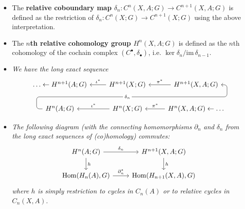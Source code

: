 \documentclass[10pt]{article}
\newcommand{\im}{\mathrm{im}\,}
\DeclareMathOperator{\Hom}{Hom}
\begin{document}
\begin{itemize}
                    \item The \textbf{relative coboundary map $\delta_n\colon C^n(X,A;G)\to C^{n+1}(X,A;G)$} is defined as the restriction of $\delta_n\colon C^n(X;G)\to C^{n+1}(X;G)$ using the above interpretation.
                    \item The \textbf{$n$th relative cohomology group $H^n(X,A;G)$} is defined as the $n$th cohomology of the cochain complex $(C^\bullet,\delta_\bullet)$, i.e. $\ker\delta_n/\im\delta_{n-1}$.
                    \item \emph{We have the long exact sequence}
                        \begin{equation*}
                            \begin{tikzcd}
                                \ldots\leftarrow{H}^{n+1}(A;G)
                                & {H}^{n+1}(X;G) \lar[swap]{\iota^*} \ar[draw=none]{d}[name=X, anchor=center]{}
                                & {H}^{n+1}(X,A;G) \lar[swap]{\pi^*}\\
                                {H}^n(A;G) \ar[rounded corners,
                                        to path={ -- ([xshift=-2ex]\tikztostart.west)
                                                  |- (X.center) \tikztonodes
                                                  -| ([xshift=2ex]\tikztotarget.east)
                                                  -- (\tikztotarget)}]{urr}[description, at end]{\delta_n}
                                & {H}^n(X;G) \lar[swap]{\iota^*}
                                & {H}^n(X,A;G) \lar[swap]{\pi^*} \leftarrow\ldots
                            \end{tikzcd}
                        \end{equation*}
                    \item \emph{The following diagram (with the connecting homomorphisms $\partial_n$ and $\delta_n$ from the long exact sequences of (co)homology) commutes:}
                        \begin{equation*}
                            \begin{tikzcd}
                                H^n(A;G) \rar{\delta_n} \dar{h}
                                & H^{n+1}(X,A;G) \dar{h}\\
                                \Hom(H_n(A),G) \rar{\partial_n^*}
                                & \Hom(H_{n+1}(X,A),G)
                            \end{tikzcd}
                        \end{equation*}
                        \emph{where $h$ is simply restriction to cycles in $C_n(A)$ or to relative cycles in $C_n(X,A)$.}
                \end{itemize}
\end{document}
